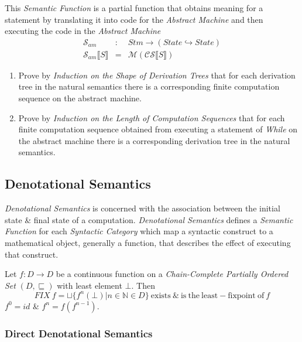 \documentclass[11pt,a4paper]{article}
\begin{document}
This \textit{Semantic Function} is a partial function that obtains meaning for a statement by translating it into code for the \textit{Abstract Machine} and then executing the code in the \textit{Abstract Machine}
\[\begin{array}{rcl}
\mathcal{S}_{am}&:&Stm\to(State\hookrightarrow State)\\
\mathcal{S}_{am}\llbracket S\rrbracket&=&\mathcal{M}(\mathcal{CS}\llbracket S\rrbracket)
\end{array}\]

\begin{enumerate}
	\item Prove by \textit{Induction on the Shape of Derivation Trees} that for each derivation tree in the natural semantics there is a corresponding finite computation sequence on the abstract machine.
	\item Prove by \textit{Induction on the Length of Computation Sequences} that for each finite computation sequence obtained from executing a statement of \textit{While} on the abstract machine there is a corresponding derivation tree in the natural semantics.
\end{enumerate}

\subsection{Denotational Semantics}

\textit{Denotational Semantics} is concerned with the association between the initial state \& final state of a computation. \textit{Denotational Semantics} defines a \textit{Semantic Function} for each \textit{Syntactic Category} which map a syntactic construct to a mathematical object, generally a function, that describes the effect of executing that construct.

Let $f:D\to D$ be a continuous function on a \textit{Chain-Complete Partially Ordered Set} $(D,\sqsubseteq)$ with least element $\bot$. Then
$$FIX\ f=\sqcup\{f^n(\bot)|n\in\mathbb{N}\in D\}\ \mathrm{exists\ \&\ is\ the\ least-fixpoint\ of\ }f$$
\NB $f^0=id$ \& $f^n=f(f^{n-1})$.

\subsubsection{Direct Denotational Semantics}
\end{document}
